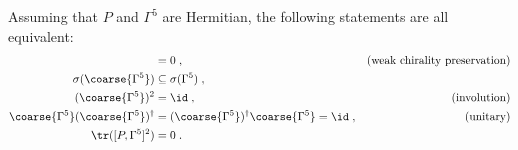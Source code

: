 \begin{lemma} \label{lemma:chirality:preservation:equiv}
Assuming that $P$ and $\Gamma^{5}$ are Hermitian, the following statements are all equivalent:
\begin{align}
[P, \Gamma^{5}] &= 0 \;, &\text{(weak chirality preservation)} \label{eq:lemma:chirality:preservation:equiv} \\
\sigma(\coarse{\Gamma^{5}}) &\subseteq \sigma(\Gamma^{5}) \;, \label{eq:lemma:sigma} \\
(\coarse{\Gamma^{5}})^{2} &= \id \;, &\text{(involution)} \label{eq:lemma:involution} \\
\coarse{\Gamma^{5}} (\coarse{\Gamma^{5}})^{\dagger} &= (\coarse{\Gamma^{5}})^{\dagger} \coarse{\Gamma^{5}} = \id \;, &\text{(unitary)} \label{eq:lemma:unitary} \\
\tr([P, \Gamma^{5}]^{2}) &= 0 \label{eq:lemma:trsq0} \;.
\end{align}
\end{lemma}
